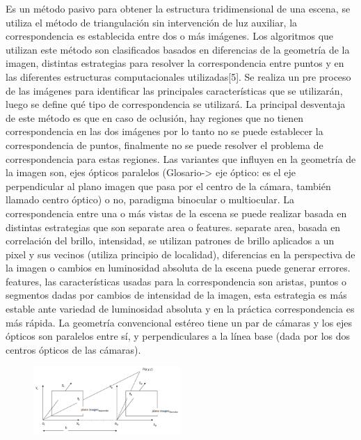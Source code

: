 Es un método pasivo para obtener la estructura tridimensional de una escena, se utiliza el método de triangulación sin intervención de luz auxiliar, la correspondencia es establecida entre dos o más imágenes.
Los algoritmos que utilizan este método son clasificados basados en diferencias de la geometría de la imagen, distintas estrategias para resolver la correspondencia entre puntos y en las diferentes estructuras computacionales utilizadas[5].
Se realiza un pre proceso de las imágenes para identificar las principales características que se utilizarán, luego se define qué tipo de correspondencia se utilizará.
La principal desventaja de este método es que en caso de oclusión, hay regiones que no tienen correspondencia en las dos imágenes por lo tanto no se puede establecer la correspondencia de puntos, finalmente no se puede resolver el problema de correspondencia para estas regiones.
Las variantes que influyen en la geometría de la imagen son, ejes ópticos paralelos (Glosario-> eje óptico: es el eje perpendicular al plano imagen que pasa por el centro de la cámara, también llamado centro óptico) o no, paradigma binocular o multiocular.
La correspondencia entre una o más vistas de la escena se puede realizar basada en distintas estrategias que son separate area o features.
   separate area, basada en correlación del brillo, intensidad, se utilizan patrones de brillo aplicados a un pixel y sus vecinos (utiliza principio de localidad), diferencias en la perspectiva de la imagen o cambios en luminosidad absoluta de la escena puede generar errores.
   features, las características usadas para la correspondencia son aristas, puntos o segmentos dadas por cambios de intensidad de la imagen, esta estrategia es más estable  ante variedad de luminosidad absoluta y en la práctica correspondencia es más rápida.
La geometría convencional estéreo tiene un par de cámaras y los ejes ópticos son paralelos entre sí, y perpendiculares a la línea base (dada por los dos centros ópticos de las cámaras).

\begin{figure}[H]
  \centering
    \includegraphics[width=0.5\textwidth]{./Cap6_reconstruccion/stereo.PNG}
  \caption{}
  \label{fig:Stereo}
\end{figure}

